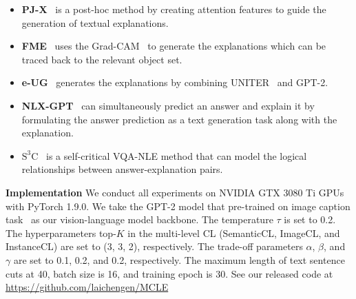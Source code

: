 \documentclass[letterpaper]{article} %
\begin{document}
\begin{itemize}
  \item \textbf{PJ-X}~\cite{park2018multimodal} is a post-hoc method by creating attention features to guide the generation of textual explanations.
  \item \textbf{FME}~\cite{wu2019faithful} uses the Grad-CAM~\cite{selvaraju2017grad} to generate the explanations which can be traced back to the relevant object set. 
  \item \textbf{e-UG}~\cite{kayser2021vil} generates the explanations by combining UNITER~\cite{chen2020uniter} and GPT-2. 
  \item \textbf{NLX-GPT}~\cite{sammani2022nlx} can simultaneously predict an answer and explain it by formulating the answer prediction as a text generation task along with the explanation.
  \item \textbf{$\text{S}^3\text{C}$}~\cite{suo2023s3c} is a self-critical VQA-NLE method that can model the logical relationships between answer-explanation pairs.
\end{itemize}

\noindent
\textbf{Implementation} We conduct all experiments on NVIDIA GTX 3080 Ti GPUs with PyTorch 1.9.0. We take the GPT-2 model that pre-trained on image caption task~\cite{sammani2022nlx} as our vision-language model backbone. The temperature $\tau$ is set to 0.2. The hyperparameters top-$K$ in the multi-level CL (SemanticCL, ImageCL, and InstanceCL) are set to (3, 3, 2), respectively. The trade-off parameters $\alpha$, $\beta$, and $\gamma$ are set to 0.1, 0.2, and 0.2, respectively. The maximum length of text sentence cuts at 40, batch size is 16, and training epoch is 30. See our released code at  \url{https://github.com/laichengen/MCLE}
\end{document}
